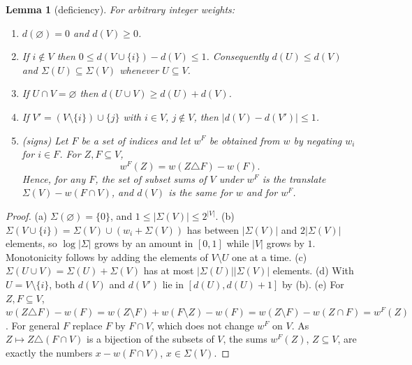 \documentclass[11pt]{article}
\newtheorem{lemma}{Lemma}[section]
\theoremstyle{definition}
\newcommand{\abs}[1]{\lvert #1\rvert}
\begin{document}
\begin{lemma}[deficiency]\label{lem:def}
For arbitrary integer weights:
\begin{enumerate}[label=\textup{(\alph*)}]
\item $d(\varnothing)=0$ and $d(V)\ge0$.
\item If $i\notin V$ then $0\le d(V\cup\{i\})-d(V)\le1$. Consequently $d(U)\le d(V)$ and $\Sigma(U)\subseteq\Sigma(V)$
whenever $U\subseteq V$.
\item If $U\cap V=\varnothing$ then $d(U\cup V)\ge d(U)+d(V)$.
\item If $V'=(V\setminus\{i\})\cup\{j\}$ with $i\in V$, $j\notin V$, then $\abs{d(V)-d(V')}\le1$.
\item \textup{(signs)} Let $F$ be a set of indices and let $w^F$ be obtained from $w$ by negating $w_i$ for
$i\in F$. For $Z,F\subseteq V$,
\begin{equation}\label{eq:sign}
 w^F(Z)=w(Z\triangle F)-w(F).
\end{equation}
Hence, for any $F$, the set of subset sums of $V$ under $w^F$ is the translate $\Sigma(V)-w(F\cap V)$, and $d(V)$
is the same for $w$ and for $w^F$.
\end{enumerate}
\end{lemma}
\begin{proof}
(a) $\Sigma(\varnothing)=\{0\}$, and $1\le\abs{\Sigma(V)}\le2^{\abs V}$. (b) $\Sigma(V\cup\{i\})=\Sigma(V)\cup(w_i+\Sigma(V))$
has between $\abs{\Sigma(V)}$ and $2\abs{\Sigma(V)}$ elements, so $\log\abs\Sigma$ grows by an amount in $[0,1]$
while $\abs V$ grows by $1$. Monotonicity follows by adding the elements of $V\setminus U$ one at a time.
(c) $\Sigma(U\cup V)=\Sigma(U)+\Sigma(V)$ has at most $\abs{\Sigma(U)}\abs{\Sigma(V)}$ elements. (d) With
$U=V\setminus\{i\}$, both $d(V)$ and $d(V')$ lie in $[d(U),d(U)+1]$ by (b). (e) For $Z,F\subseteq V$,
$w(Z\triangle F)-w(F)=w(Z\setminus F)+w(F\setminus Z)-w(F)=w(Z\setminus F)-w(Z\cap F)=w^F(Z)$. For general $F$
replace $F$ by $F\cap V$, which does not change $w^F$ on $V$. As $Z\mapsto Z\triangle(F\cap V)$ is a bijection of the
subsets of $V$, the sums $w^F(Z)$, $Z\subseteq V$, are exactly the numbers $x-w(F\cap V)$, $x\in\Sigma(V)$.
\end{proof}
\end{document}
